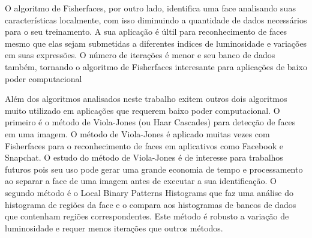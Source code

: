 	O algoritmo de Fisherfaces, por outro lado, identifica uma face analisando suas características localmente, com isso diminuindo a quantidade de dados necessários para o seu treinamento. A sua aplicação é últil para reconhecimento de faces mesmo que elas sejam submetidas a diferentes indices de luminosidade e variações em suas expressões. O número de iterações é menor e seu banco de dados também, tornando o algoritmo de Fisherfaces interesante para aplicações de baixo poder computacional 


	Além dos algoritmos analisados neste trabalho exitem outros dois algoritmos muito utilizado em aplicações que requerem baixo poder computacional. O primeiro é o método de Viola-Jones (ou Haar Cascades) para detecção de faces em uma imagem. O método de Viola-Jones é aplicado muitas vezes com Fisherfaces para o reconhecimento de faces em aplicativos como Facebook e Snapchat. O estudo do método de Viola-Jones é de interesse para trabalhos futuros pois seu uso pode gerar uma grande economia de tempo e processamento ao separar a face de uma imagem antes de executar a sua identificação. O segundo método é o Local Binary Patterns Histograms que faz uma análise do histograma de regiões da face e o compara aos histogramas de bancos de dados que contenham regiões correspondentes. Este método é robusto a variação de luminosidade e requer menos iterações que outros métodos.
	
	

